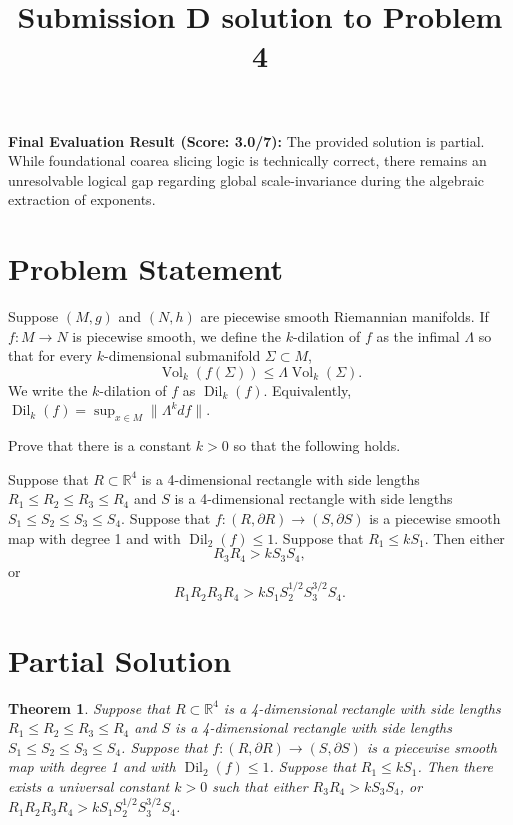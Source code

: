 \documentclass[12pt]{article}
\DeclareMathOperator{\Vol}{Vol}
\DeclareMathOperator{\Dil}{Dil}
\newcommand{\RR}{\mathbb{R}}
\newtheorem{theorem}{Theorem}
\begin{document}
\title{Submission D solution to Problem 4}
\date{}
\maketitle

\noindent \textbf{Final Evaluation Result (Score: 3.0/7):} The provided solution is partial. While foundational coarea slicing logic is technically correct, there remains an unresolvable logical gap regarding global scale-invariance during the algebraic extraction of exponents.

\section*{Problem Statement}

Suppose $(M, g)$ and $(N,h)$ are piecewise smooth Riemannian manifolds. If $f: M \rightarrow N$ is piecewise smooth, we define the $k$-dilation of $f$ as the infimal $\Lambda$ so that for every $k$-dimensional submanifold $\Sigma \subset M$, 
\[ \Vol_k( f(\Sigma) ) \le \Lambda \Vol_k (\Sigma). \]
We write the $k$-dilation of $f$ as $\Dil_k(f)$. Equivalently, $\Dil_k(f) = \sup_{x \in M} \| \Lambda^k df \|$.

Prove that there is a constant $k > 0$ so that the following holds.

Suppose that $R \subset \RR^4$ is a 4-dimensional rectangle with side lengths $R_1 \le R_2 \le R_3 \le R_4$ and $S$ is a 4-dimensional rectangle with side lengths $S_1 \le S_2 \le S_3 \le S_4$. Suppose that $f: (R, \partial R) \rightarrow (S, \partial S)$ is a piecewise smooth map with degree 1 and with $\Dil_2(f) \le 1$. Suppose that $R_1 \le k S_1$. Then either
\[ R_3 R_4 > k S_3 S_4, \]
or 
\[ R_1 R_2 R_3 R_4 > k S_1 S_2^{1/2} S_3^{3/2} S_4. \]

\section*{Partial Solution}

\begin{theorem}
Suppose that $R \subset \mathbb{R}^4$ is a 4-dimensional rectangle with side lengths $R_1 \le R_2 \le R_3 \le R_4$ and $S$ is a 4-dimensional rectangle with side lengths $S_1 \le S_2 \le S_3 \le S_4$. Suppose that $f: (R, \partial R) \rightarrow (S, \partial S)$ is a piecewise smooth map with degree 1 and with $\Dil_2(f) \le 1$. Suppose that $R_1 \le k S_1$. Then there exists a universal constant $k > 0$ such that either $R_3 R_4 > k S_3 S_4$, or $R_1 R_2 R_3 R_4 > k S_1 S_2^{1/2} S_3^{3/2} S_4$.
\end{theorem}
\end{document}
